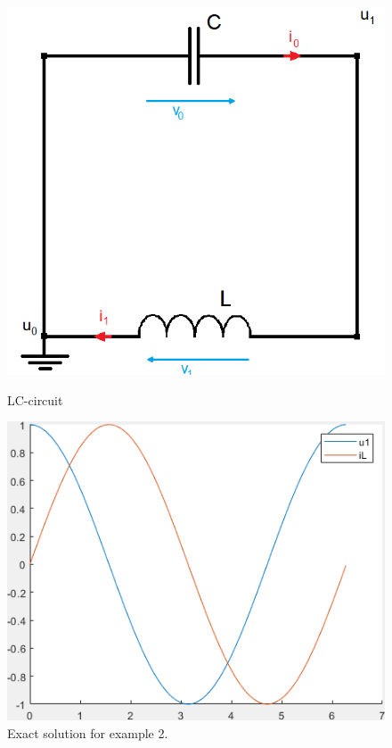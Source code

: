 \begin{frame}[noframenumbering]
	
	\begin{figure}[H]
		\centering
		\begin{minipage}{.35\textwidth}
			\centering
			\includegraphics[width=\linewidth]{../Tex/pictures/Example2_index0.png}
			\caption{LC-circuit}
			\label{fig: LC-circuit}
		\end{minipage}%
		\begin{minipage}{.5\textwidth}
			\centering
			\includegraphics[width=\linewidth]{../Matlab/exact_solution_ex2.png}
			\caption{Exact solution for example 2.}
			\label{fig: Exact solution for example 2}
		\end{minipage}
	\end{figure}
\end{frame}
	

